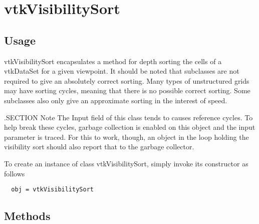 \section{vtkVisibilitySort}

\subsection{Usage}

 vtkVisibilitySort encapsulates a method for depth sorting the cells of a
 vtkDataSet for a given viewpoint.  It should be noted that subclasses
 are not required to give an absolutely correct sorting.  Many types of
 unstructured grids may have sorting cycles, meaning that there is no
 possible correct sorting.  Some subclasses also only give an approximate
 sorting in the interest of speed.

 .SECTION Note
 The Input field of this class tends to causes reference cycles.  To help
 break these cycles, garbage collection is enabled on this object and the
 input parameter is traced.  For this to work, though, an object in the
 loop holding the visibility sort should also report that to the garbage
 collector.


To create an instance of class vtkVisibilitySort, simply
invoke its constructor as follows
\begin{verbatim}
  obj = vtkVisibilitySort
\end{verbatim}
\subsection{Methods}

